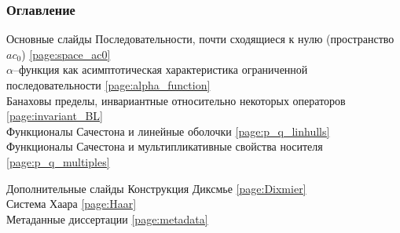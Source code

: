 \begin{frame}\frametitle{Оглавление}
	\begin{block}{Основные слайды}
		Последовательности, почти сходящиеся к нулю (пространство $ac_0$)
		\hfill
		\ref{page:space_ac0}
		\\
		$\alpha$--функция как асимптотическая характеристика ограниченной последовательности
		\hfill
		\ref{page:alpha_function}
		\\
		Банаховы пределы, инвариантные относительно некоторых операторов
		\hfill
		\ref{page:invariant_BL}
		\\
		Функционалы Сачестона и линейные оболочки
		\hfill
		\ref{page:p_q_linhulls}
		\\
		Функционалы Сачестона и мультипликативные свойства носителя
		\hfill
		\ref{page:p_q_multiples}
	\end{block}

	\begin{block}{Дополнительные слайды}
		Конструкция Диксмье
		\hfill
		\ref{page:Dixmier}
		\\
		Система Хаара
		\hfill
		\ref{page:Haar}
		\\
		Метаданные диссертации
		\hfill
		\ref{page:metadata}
	\end{block}
\end{frame}

